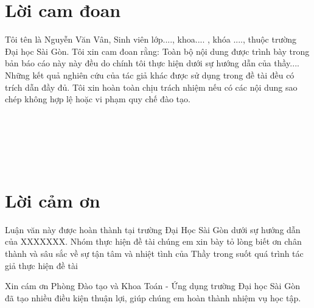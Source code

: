 \documentclass[12pt,a4paper]{report}
\begin{document}
	\renewcommand{\baselinestretch}{1.2}
	\fontsize{13pt}{20pt}\selectfont
	
	\chapter*{Lời cam đoan}
	\thispagestyle{fancy}
	\vspace{1cm}
	\indent
	
	Tôi tên là Nguyễn Văn Vân, Sinh viên lớp...., khoa.... , khóa ....,  thuộc trường Đại học Sài Gòn. Tôi xin cam đoan rằng: Toàn bộ nội dung được trình bày trong bản báo cáo này này đều do chính tôi thực hiện dưới sự hướng dẫn của thầy.... Những kết quả nghiên cứu của tác giả khác được sử dụng trong đề tài  đều có trích dẫn đầy đủ. Tôi xin hoàn toàn chịu trách nhiệm nếu có các nội dung sao chép không hợp lệ hoặc vi phạm quy chế đào tạo. 
	\\
	\\
	\\
	\\
	\\
	\\
	
	
	\chapter*{Lời cảm ơn}
	\thispagestyle{fancy}
	\vspace{1cm}
	\indent
	
	Luận văn này được hoàn thành tại trường Đại Học Sài Gòn dưới sự hướng dẫn của XXXXXXX. Nhóm thực hiện đề tài chúng em  xin bày tỏ lòng biết ơn chân thành và sâu sắc về sự tận tâm và nhiệt tình của Thầy trong suốt quá trình tác giả thực hiện đề tài
	
	
	\bigskip
	Xin cám ơn Phòng Đào tạo  và Khoa Toán - Ứng dụng trường Đại học Sài Gòn đã tạo nhiều điều kiện thuận lợi, giúp chúng em hoàn thành nhiệm vụ học tập.
	\\
	\\
	\\
	\\
	\\
	
\end{document}
